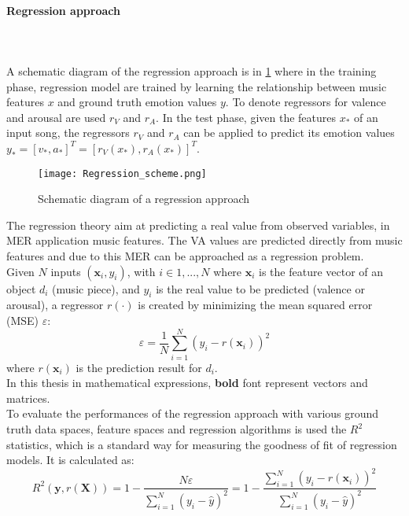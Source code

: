 \paragraph{Regression approach}
\mbox{} \\ \\ \indent
A schematic diagram of the regression approach is in \ref{fig:Regression_scheme} where in the training phase, regression model are trained by learning the relationship between music features $x$ and ground truth emotion values $y$. To denote regressors for valence and arousal are used $r_V$ and $r_A$. In the test phase, given the features $x_*$ of an input song, the regressors $r_V$ and $r_A$ can be applied to predict its emotion values $y_*=[v_*,a_*]^T = [r_V(x_*), r_A(x_*)]^T$.
\begin{figure}[h]
    \centering
    \texttt{[image: Regression\_scheme.png]} 
	\caption{Schematic diagram of a regression approach}
    \label{fig:Regression_scheme}
\end{figure}
The regression theory aim at predicting a real value from observed variables, in MER application music features.  The VA values are predicted directly from music features and due to this MER can be approached as a regression problem.
\\ \indent
Given $N$ inputs $(\textbf{x}_i,y_i)$, with $i \in {1, ..., N}$ where $\textbf{x}_i$ is the feature vector of an object $d_i$ (music piece), and $y_i$ is the real value to be predicted (valence or arousal), a regressor $r(\cdot)$ is created by minimizing the mean squared error (MSE) $\varepsilon$:
\begin{equation}
	\varepsilon = \dfrac{1}{N} \sum_{i=1}^{N} (y_i-r(\textbf{x}_i))^2
\end{equation}
where $r(\textbf{x}_i)$ is the prediction result for $d_i$.
\\
In this thesis in mathematical expressions, \textbf{bold} font represent vectors and matrices.
\\ \indent
To evaluate the performances of the regression approach with various ground truth data spaces, feature spaces and regression algorithms is used the $R^2$ statistics, which is a standard way for measuring the goodness of fit of regression models. It is calculated as:
\begin{equation}
	R^2(\textbf{y},r(\textbf{X}))=1-\dfrac{N\varepsilon}{\sum_{i=1}^{N} (y_i-\widehat{y})^2}=1-\dfrac{\sum_{i=1}^{N} (y_i-r(\textbf{x}_i))^2}{\sum_{i=1}^{N} (y_i-\widehat{y})^2}
\end{equation}
